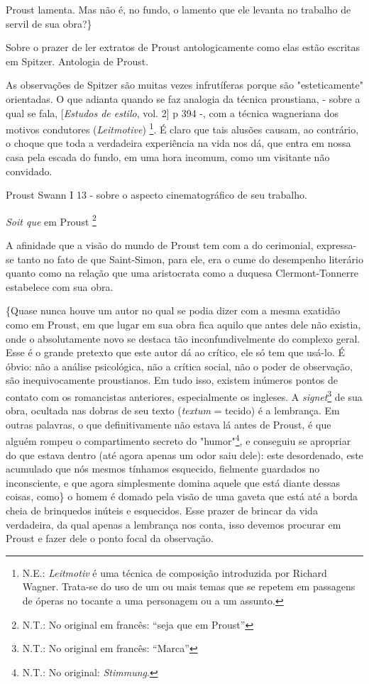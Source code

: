 Proust lamenta. Mas não é, no fundo, o lamento que ele levanta no
trabalho de servil de sua obra?\}

Sobre o prazer de ler extratos de Proust antologicamente como elas estão
escritas em Spitzer. Antologia de Proust.

As observações de Spitzer são muitas vezes infrutíferas porque são
"esteticamente" orientadas. O que adianta quando se faz analogia da
técnica proustiana, - sobre a qual se fala, {[}\emph{Estudos de estilo},
vol. 2{]} p 394 -, com a técnica wagneriana dos motivos condutores
(\emph{Leitmotive}) \footnote{N.E.: \emph{Leitmotiv} é uma técnica de
  composição introduzida por Richard Wagner. Trata-se do uso de um ou
  mais temas que se repetem em passagens de óperas no tocante a uma
  personagem ou a um assunto.}. É claro que tais alusões causam, ao
contrário, o choque que toda a verdadeira experiência na vida nos dá,
que entra em nossa casa pela escada do fundo, em uma hora incomum, como
um visitante não convidado.

Proust Swann I 13 - sobre o aspecto cinematográfico de seu trabalho.

\emph{Soit que} em Proust \footnote{N.T.: No original em francês: ``seja
  que em Proust''}

A afinidade que a visão do mundo de Proust tem com a do cerimonial,
expressa-se tanto no fato de que Saint-Simon, para ele, era o cume do
desempenho literário quanto como na relação que uma aristocrata como a
duquesa Clermont-Tonnerre estabelece com sua obra.

\{Quase nunca houve um autor no qual se podia dizer com a mesma exatidão
como em Proust, em que lugar em sua obra fica aquilo que antes dele não
existia, onde o absolutamente novo se destaca tão inconfundivelmente do
complexo geral. Esse é o grande pretexto que este autor dá ao crítico,
ele só tem que usá-lo. É óbvio: não a análise psicológica, não a crítica
social, não o poder de observação, são inequivocamente proustianos. Em
tudo isso, existem inúmeros pontos de contato com os romancistas
anteriores, especialmente os ingleses. A \emph{signet}\footnote{N.T.: No
  original em francês: ``Marca''} de sua obra, ocultada nas dobras de
seu texto (\emph{textum} = tecido) é a lembrança. Em outras palavras, o
que definitivamente não estava lá antes de Proust, é que alguém rompeu o
compartimento secreto do "humor"\footnote{N.T.: No original:
  \emph{Stimmung}.}, e conseguiu se apropriar do que estava dentro (até
agora apenas um odor saiu dele): este desordenado, este acumulado que
nós mesmos tínhamos esquecido, fielmente guardados no inconsciente, e
que agora simplesmente domina aquele que está diante dessas coisas,
como\} o homem é domado pela visão de uma gaveta que está até a borda
cheia de brinquedos inúteis e esquecidos. Esse prazer de brincar da vida
verdadeira, da qual apenas a lembrança nos conta, isso devemos procurar
em Proust e fazer dele o ponto focal da observação.

